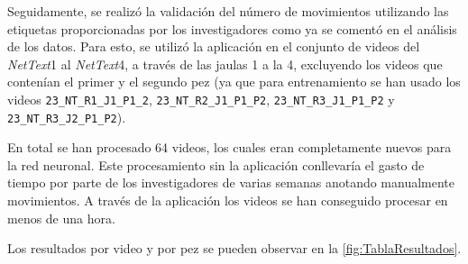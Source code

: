 \clearpage

Seguidamente, se realizó la validación del número de movimientos utilizando las etiquetas proporcionadas por los investigadores como ya se comentó en el análisis de los datos. Para esto, se utilizó la aplicación en el conjunto de 
videos del \textit{NetText}1 al \textit{NetText}4, a través de las jaulas 1 a la 4, excluyendo los videos que contenían el primer y el segundo pez (ya que para entrenamiento se han usado los videos \verb|23_NT_R1_J1_P1_2|, \verb|23_NT_R2_J1_P1_P2|, \verb|23_NT_R3_J1_P1_P2| 
y \verb|23_NT_R3_J2_P1_P2|).

En total se han procesado 64 videos, los cuales eran completamente nuevos para la red neuronal. Este procesamiento sin la aplicación conllevaría el gasto de tiempo por parte de los investigadores de varias semanas anotando manualmente movimientos. 
A través de la aplicación los videos se han conseguido procesar en menos de una hora.

Los resultados por video y por pez se pueden observar en la \autoref{fig:TablaResultados}.

